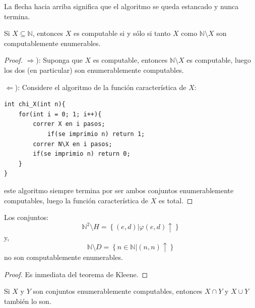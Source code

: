 \documentclass[12pt]{report}
\newcounter{it}
\theoremstyle{largebreak}
\begin{document}
    \begin{obs}
        La flecha hacia arriba significa que el algoritmo se queda estancado y nunca termina.
    \end{obs}

    \begin{theor}
        Si $X\subseteq\mathbb{N}$, entonces $X$ es computable si y sólo si tanto $X$ como $\mathbb{N}\setminus X$ son computablemente enumerables.
    \end{theor}

    \begin{proof}
        $\Rightarrow$): Suponga que $X$ es computable, entonces $\mathbb{N}\setminus X$ es computable, luego los dos (en particular) son enumerablemente computables.

        $\Leftarrow$): Considere el algoritmo de la función característica de $X$:
        
        \begin{lstlisting}
int chi_X(int n){
    for(int i = 0; 1; i++){
        correr X en i pasos;
            if(se imprimio n) return 1;
        correr N\X en i pasos;
        if(se imprimio n) return 0;
    }
}
        \end{lstlisting}
        este algoritmo siempre termina por ser ambos conjuntos enumerablemente computables, luego la función característica de $X$ es total.
    \end{proof}

    \begin{cor}
        Los conjuntos:
        \begin{equation*}
            \mathbb{N}^2\setminus H=\left\{(e,d)\Big|\varphi(e,d)\uparrow \right\}
        \end{equation*}
        y,
        \begin{equation*}
            \mathbb{N}\setminus D=\left\{n\in\mathbb{N} \Big|(n,n)\uparrow \right\}
        \end{equation*}
        no son computablemente enumerables.
    \end{cor}

    \begin{proof}
        Es inmediata del teorema de Kleene.
    \end{proof}

    \begin{obs}
        Si $X$ y $Y$ son conjuntos enumerablemente computables, entonces $X\cap Y$ y $X\cup Y$ también lo son.
    \end{obs}
\end{document}

